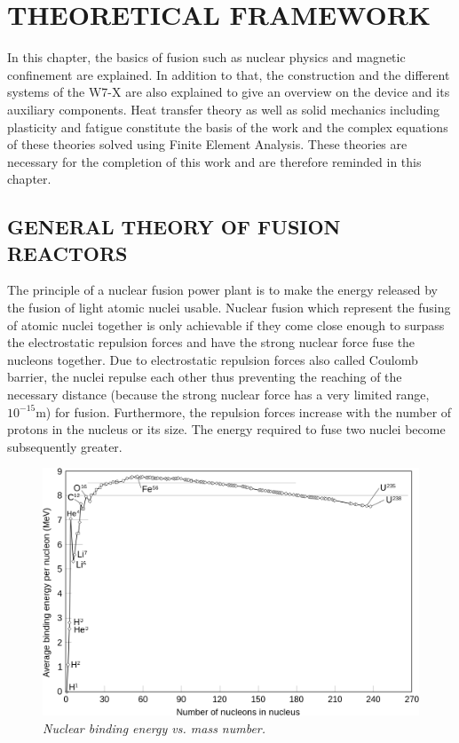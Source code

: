 \chapter{THEORETICAL FRAMEWORK}
\normalsize{In this chapter, the basics of fusion such as nuclear physics and magnetic confinement are explained. In addition to that, the construction and the different systems of the W7-X are also explained to give an overview on the device and its auxiliary components. Heat transfer theory as well as solid mechanics including plasticity and fatigue constitute the basis of the work and the complex equations of these theories solved using Finite Element Analysis. These theories are necessary for the completion of this work and are therefore reminded in this chapter.}
\section{GENERAL THEORY OF FUSION REACTORS}
\normalsize{The principle of a nuclear fusion power plant is to make the energy released by the fusion of light atomic nuclei usable. Nuclear fusion which represent the fusing of atomic nuclei together is only achievable if they come close enough to surpass the electrostatic repulsion forces and have the strong nuclear force fuse the nucleons together. Due to electrostatic repulsion forces also called Coulomb barrier, the nuclei repulse each other thus preventing the reaching of the necessary distance (because the strong nuclear force has a very limited range, ~$10^{-15}$m) \cite{diekmann_energie:_2014}\cite{Freidberg_2007} for fusion. Furthermore, the repulsion forces increase with the number of protons in the nucleus or its size. The energy required to fuse two nuclei become subsequently greater.}
\\
\begin{figure}[h!] 
    \centering
    \includegraphics[width=.7\textwidth]{figures/fig_1.png}
    \caption{\it Nuclear binding energy vs. mass number.}
    \label{fig:fig_2_1}
\end{figure}
